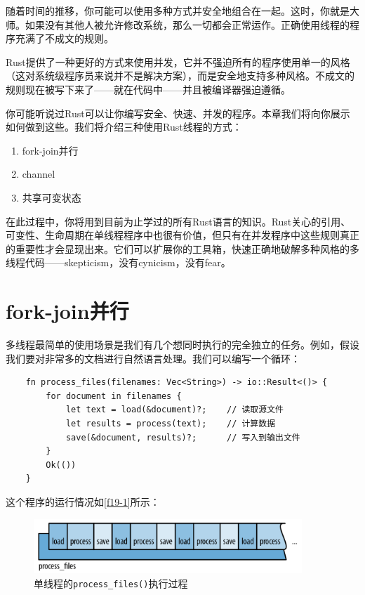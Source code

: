 随着时间的推移，你可能可以使用多种方式并安全地组合在一起。这时，你就是大师。如果没有其他人被允许修改系统，那么一切都会正常运作。正确使用线程的程序充满了不成文的规则。

Rust提供了一种更好的方式来使用并发，它并不强迫所有的程序使用单一的风格（这对系统级程序员来说并不是解决方案），而是安全地支持多种风格。不成文的规则现在被写下来了——就在代码中——并且被编译器强迫遵循。

你可能听说过Rust可以让你编写安全、快速、并发的程序。本章我们将向你展示如何做到这些。我们将介绍三种使用Rust线程的方式：
\begin{enumerate}
    \item fork-join并行
    \item channel
    \item 共享可变状态
\end{enumerate}

在此过程中，你将用到目前为止学过的所有Rust语言的知识。Rust关心的引用、可变性、生命周期在单线程程序中也很有价值，但只有在并发程序中这些规则真正的重要性才会显现出来。它们可以扩展你的工具箱，快速正确地破解多种风格的多线程代码——skepticism，没有cynicism，没有fear。

\section{fork-join并行}
多线程最简单的使用场景是我们有几个想同时执行的完全独立的任务。例如，假设我们要对非常多的文档进行自然语言处理。我们可以编写一个循环：
\begin{verbatim}
    fn process_files(filenames: Vec<String>) -> io::Result<()> {
        for document in filenames {
            let text = load(&document)?;    // 读取源文件
            let results = process(text);    // 计算数据
            save(&document, results)?;      // 写入到输出文件
        }
        Ok(())
    }
\end{verbatim}

这个程序的运行情况如\autoref{f19-1}所示：

\begin{figure}[htbp]
    \centering
    \includegraphics[width=0.9\textwidth]{../img/f19-1.png}
    \caption{单线程的\texttt{process\_files()}执行过程}
    \label{f19-1}
\end{figure}

